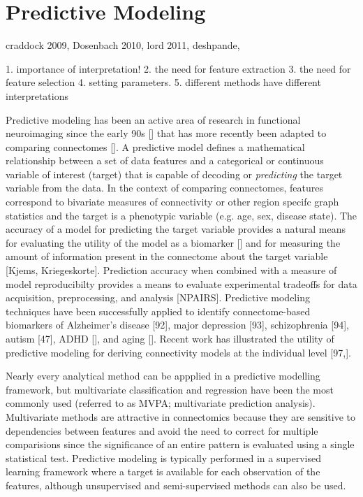 \documentclass[5p]{elsarticle}
\begin{document}
\section{Predictive Modeling}
craddock 2009, Dosenbach 2010, lord 2011, deshpande, 

1. importance of interpretation!
2. the need for feature extraction
3. the need for feature selection
4. setting parameters.
5. different methods have different interpretations


Predictive modeling has been an active area of research in functional
neuroimaging since the early 90s [] that has more recently been adapted to
comparing connectomes [].  A predictive model defines a mathematical
relationship between a set of data features and a categorical or continuous
variable of interest (target) that is capable of decoding or \emph{predicting}
the target variable from the data.  In the context of comparing connectomes,
features correspond to bivariate measures of connectivity or other region
specifc graph statistics and the target is a phenotypic variable (e.g. age, sex,
disease state). The accuracy of a model for predicting the target variable
provides a natural means for evaluating the utility of the model as a biomarker
[] and for measuring the amount of information present in the connectome about
the target variable [Kjems, Kriegeskorte]. Prediction accuracy when combined
with a measure of model reproducibilty provides a means to evaluate experimental
tradeoffs for data acquisition, preprocessing, and analysis [NPAIRS]. Predictive
modeling techniques have been successfully applied to identify connectome-based
biomarkers of Alzheimer's disease [92], major depression [93], schizophrenia
[94], autism [47], ADHD [], and aging [].  Recent work has illustrated the
utility of predictive modeling for deriving connectivity models at the
individual level [97,].

Nearly every analytical method can be appplied in a predictive modelling framework, but
multivariate classification and regression have been the most commonly used
(referred to as MVPA; multivariate prediction analysis).  Multivariate methods
are attractive in connectomics because they are sensitive to dependencies
between features and avoid the need to correct for multiple comparisions since
the significance of an entire pattern is evaluated using a single statistical
test. Predictive modeling is typically performed in a supervised learning
framework where a target is available for each observation of the features,
although unsupervised and semi-supervised methods can also be used.
\end{document}
